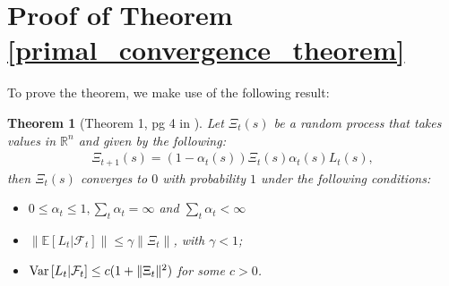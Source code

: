 \documentclass{article}
\newtheorem{theorem}{Theorem}
\begin{document}
\section*{Proof of Theorem  \ref{primal_convergence_theorem}}
To prove the theorem, we make use of the following result:
\begin{theorem}[Theorem 1, pg 4 in \cite{jaakkola1994convergence}]
Let $\Xi_t(s)$ be a random process that takes values in $\mathbb{R}^n$ and given by the following:
\begin{align}
    \Xi_{t+1}(s)=\left(1-\alpha_t(s)\right)\Xi_{t}(s)\alpha_t(s)L_t(s),
\end{align}
then $\Xi_t(s)$ converges to $0$ with probability $1$ under the following conditions:
\begin{itemize}
\item[i)] $0\leq \alpha_t\leq 1, \sum_t\alpha_t=\infty$ and $\sum_t\alpha_t<\infty$
\item[ii)] $\|\mathbb{E}[L_t|\mathcal{F}_t]\|\leq \gamma \|\Xi_t\|$, with $\gamma <1$;
\item[iii)] ${\rm Var}\left[L_t|\mathcal{F}_t\right]\leq c(1+\|\Xi_t\|^2)$ for some $c>0$.
\end{itemize}
\end{theorem}
\end{document}
